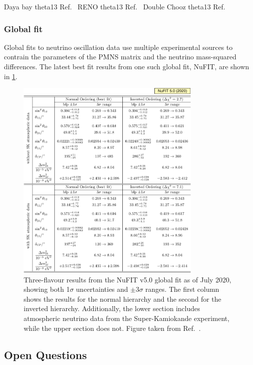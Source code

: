 Daya bay theta13 Ref.~\cite{an2012}
RENO theta13 Ref.~\cite{ahn2012}
Double Chooz theta13 Ref.~\cite{abe2012}

\subsubsection*{Global fit} %

Global fits to neutrino oscillation data use multiple experimental sources to contrain the
parameters of the PMNS matrix and the neutrino mass-squared differences. The latest best fit
results from one such global fit, NuFIT, are shown in \ref{fig:best_fit}.

\begin{figure} %
    \includegraphics[origin=c,width=0.8\textwidth]{diagrams/3-theory/best_fit.pdf}
    \caption[best fit short]
    {Three-flavour results from the NuFIT v5.0 global fit as of July 2020, showing both
        1$\sigma$ uncertainties and $\pm 3 \sigma$ ranges. The first column shows the results
        for the normal hierarchy and the second for the inverted hierarchy. Additionally, the
        lower section includes atmospheric neutrino data from the Super-Kamiokande experiment,
        while the upper section does not. Figure taken from Ref.~\cite{esteban2020}.}
    \label{fig:best_fit}
\end{figure}

\subsection{Open Questions} %
\label{sec:theory_status_open} %

